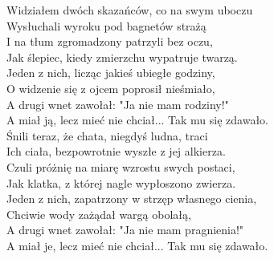 \begin{text}
    Widziałem dwóch skazańców, co na swym uboczu\\
    Wysłuchali wyroku pod bagnetów strażą\\
    I na tłum zgromadzony patrzyli bez oczu,\\
    Jak ślepiec, kiedy zmierzchu wypatruje twarzą.\\
    Jeden z nich, licząc jakieś ubiegłe godziny,\\
    O widzenie się z ojcem poprosił nieśmiało,\\
    A drugi wnet zawołał: "Ja nie mam rodziny!"\\
    A miał ją, lecz mieć nie chciał... Tak mu się zdawało.\\

    Śnili teraz, że chata, niegdyś ludna, traci\\
    Ich ciała, bezpowrotnie wyszłe z jej alkierza.\\
    Czuli próżnię na miarę wzrostu swych postaci,\\
    Jak klatka, z której nagle wypłoszono zwierza.\\
    Jeden z nich, zapatrzony w strzęp własnego cienia,\\
    Chciwie wody zażądał wargą obolałą,\\
    A drugi wnet zawołał: "Ja nie mam pragnienia!"\\
    A miał je, lecz mieć nie chciał... Tak mu się zdawało.
\end{text}
\begin{chord}
\end{chord}